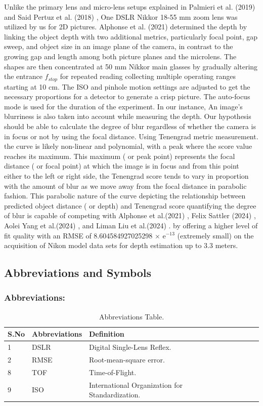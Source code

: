 \documentclass[sn-mathphys]{sn-jnl}%
\theoremstyle{thmstyleone}%
\theoremstyle{thmstyletwo}%
\theoremstyle{thmstylethree}%
\begin{document}
Unlike the primary lens and micro-lens setups explained in Palmieri et al. (2019) \cite{bib9} and Said Pertuz et al. (2018) \cite{bib11}, One DSLR Nikkor 18-55 mm zoom lens was utilized by us for 2D pictures. Alphonse et al. (2021) \cite{bib10}  determined the depth by linking the object depth with two additional metrics, particularly focal point, gap sweep, and object size in an image plane of the camera, in contrast to the growing gap and length among both picture planes and the microlens. The shapes are then concentrated at 50 mm Nikkor main glasses by gradually altering the entrance  $f_{stop}$ for repeated reading collecting multiple operating ranges starting at 10 cm. The ISO and pinhole motion settings are adjusted to get the necessary proportions for a detector to generate a crisp picture. The auto-focus mode is used for the duration of the experiment. In our instance, An image's blurriness is also taken into account while measuring the depth. Our hypothesis should be able to calculate the degree of blur regardless of whether the camera is in focus or not by using the focal distance. Using Tenengrad metric measurement. the curve is likely non-linear and polynomial, with a peak where the score value reaches its maximum. This maximum ( or peak point) represents the focal distance ( or focal point) at which the image is in focus and from this point either to the left or right side, the Tenengrad score tends to vary in proportion with the amount of blur as we move away from the focal distance in parabolic fashion. This parabolic nature of the curve depicting the relationship between predicted object distance ( or depth) and Tenengrad score quantifying the degree of blur is capable of competing with Alphonse et al.(2021) \cite{bib10}, Felix Sattler (2024) \cite{bib15}, Aolei Yang et al.(2024) \cite{bib14}, and Liman Liu et al.(2024) \cite{bib16}. by offering a higher level of fit quality with an RMSE of 8.604584927025298 $\times$  e$^{-13}$ (extremely small)  on the acquisition of Nikon model data sets for depth estimation up to 3.3 meters.\pagebreak
\subsection{Abbreviations and Symbols }
\subsubsection{Abbreviations: }

\begin{table}[!htbp]
 \caption{Abbreviations Table.} \label{tab:am6}
 
\begin{tabular}
{ l l l l l l}\hline S.No&Abbreviations& Definition \\
\hline
\hline
1&DSLR&Digital Single-Lens Reflex.\\
\hline
2&RMSE&Root-mean-square error.\\
\hline
8&TOF&Time-of-Flight. \\
\hline
9&ISO&International Organization for Standardization.\\
\hline
 \end{tabular}
\end{table}
\end{document}
